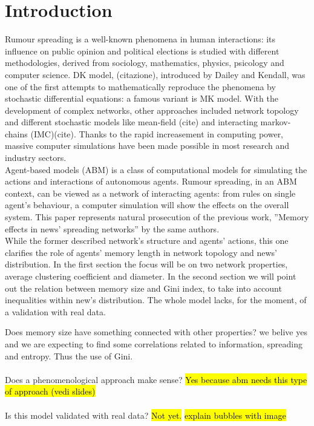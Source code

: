 \section{Introduction}
Rumour spreading is a well-known phenomena in human interactions: its influence on public opinion and political elections is studied with different methodologies, derived from sociology, mathematics, physics, psicology and computer science.
DK model, (citazione), introduced by Dailey and Kendall, was one of the first attempts to mathematically reproduce the phenomena by stochastic differential equations: a famous variant is MK model.
With the development of complex networks, other approaches included network topology 
and different stochastic models like mean-field (cite) and interacting markov-chains (IMC)(cite).
Thanks to the rapid increasement in computing power, massive computer simulations have been made possible in most research and industry sectors.\\
Agent-based models (ABM) is a class of computational models for simulating the actions and interactions of autonomous agents.
Rumour spreading, in an ABM context, can be viewed as a network of interacting agents: from rules on single agent's behaviour,  a computer simulation will show the effects on the overall system.
This paper represents natural prosecution of the previous work,
''Memory effects in news' spreading networks'' by the same authors.\\
While the former described network's structure and agents' actions, this one clarifies the role of agents' memory length in network topology and news' distribution.
In the first section the focus will be on two network properties, average clustering coefficient and diameter.
In the second section we will point out the relation between memory size
and Gini index, to take into account inequalities within new's distribution. 
The whole model lacks, for the moment, of a validation with real data.

Does memory size have something connected with other properties?
we belive yes and we are expecting to find some correlations related
to information, spreading and entropy. Thus the use of Gini.\\ \\
Does a phenomenological approach make sense? \hl{Yes because abm needs
this type of approach (vedi slides)}\\ \\
Is this model validated with real data? \hl{Not yet.}
\hl{explain bubbles with image}